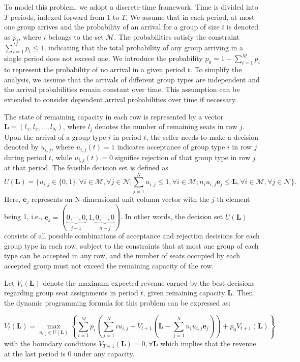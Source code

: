 To model this problem, we adopt a discrete-time framework. Time is divided into $T$ periods, indexed forward from $1$ to $T$. We assume that in each period, at most one group arrives and the probability of an arrival for a group of size $i$ is denoted as $p_i$, where $i$ belongs to the set $\mathcal{M}$. The probabilities satisfy the constraint $\sum_{i=1}^M p_i \leq 1$, indicating that the total probability of any group arriving in a single period does not exceed one. We introduce the probability $p_0 = 1 - \sum_{i=1}^{M} p_i$ to represent the probability of no arrival in a given period $t$. To simplify the analysis, we assume that the arrivals of different group types are independent and the arrival probabilities remain constant over time. This assumption can be extended to consider dependent arrival probabilities over time if necessary.

The state of remaining capacity in each row is represented by a vector $\mathbf{L} = (l_1, l_2, \ldots, l_N)$, where $l_j$ denotes the number of remaining seats in row $j$. Upon the arrival of a group type $i$ in period $t$, the seller needs to make a decision denoted by $u_{i,j}$, where $u_{i,j}(t) = 1$ indicates acceptance of group type $i$ in row $j$ during period $t$, while $u_{i,j}(t) = 0$ signifies rejection of that group type in row $j$ at that period. The feasible decision set is defined as $$U(\mathbf{L}) = \{u_{i,j} \in \{0,1\}, \forall i \in \mathcal{M}, \forall j \in \mathcal{N} | \sum_{j=1}^{N} u_{i,j} \leq 1, \forall i \in \mathcal{M}; n_{i}u_{i,j}\mathbf{e}_j \leq \mathbf{L}, \forall i \in \mathcal{M}, \forall j \in \mathcal{N}\}.$$ Here, $\mathbf{e}_j$ represents an N-dimensional unit column vector with the $j$-th element being 1, i.e., $\mathbf{e}_j = (\underbrace{0, \cdots, 0}_{j-1}, 1, \underbrace{0, \cdots, 0}_{n-j})$. In other words, the decision set $U(\mathbf{L})$ consists of all possible combinations of acceptance and rejection decisions for each group type in each row, subject to the constraints that at most one group of each type can be accepted in any row, and the number of seats occupied by each accepted group must not exceed the remaining capacity of the row.


Let $V_t(\mathbf{L})$ denote the maximum expected revenue earned by the best decisions regarding group seat assignments in period $t$, given remaining capacity $\mathbf{L}$. Then, the dynamic programming formula for this problem can be expressed as:

\begin{equation}\label{DP}
V_{t}(\mathbf{L}) = \max_{u_{i,j} \in U(\mathbf{L})}\left\{ \sum_{i=1}^{M} p_i ( \sum_{j=1}^{N} i u_{i,j} + V_{t+1}(\mathbf{L}- \sum_{j=1}^{N} n_i u_{i,j}\mathbf{e}_j)) + p_0 V_{t+1}(\mathbf{L})\right\}
\end{equation}
with the boundary conditions $V_{T+1}(\mathbf{L}) = 0, \forall \mathbf{L}$ which implies that the revenue at the last period is 0 under any capacity.

